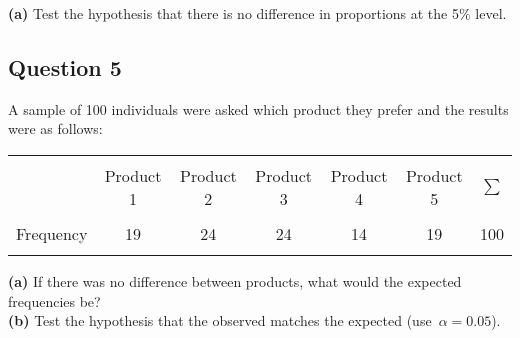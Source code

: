 \documentclass[12pt]{article}
\begin{document}
{\bf(a)} Test the hypothesis that there is no difference in proportions at the 5\% level.



\subsection*{Question 5}
A sample of 100 individuals were asked which product they prefer and the results were as follows:  \\[-0.2cm]
\begin{center}
\begin{tabular}{|c|ccccc|c|}
\hline
&&&&&&\\[-0.3cm]
 & Product 1 & Product 2 & Product 3 & Product 4 & Product 5 & $\sum$ \\[0.1cm]
\hline
&&&&&&\\[-0.3cm]
Frequency & 19 & 24 & 24 & 14 & 19 & 100\\[0.1cm]
\hline
\multicolumn{7}{c}{}\\[-0.3cm]
\end{tabular}
\end{center}

{\bf(a)} If there was no difference between products, what would the expected frequencies be? \quad \\{\bf(b)} Test the hypothesis that the observed matches the expected \mbox{(use $\alpha=0.05$)}.
\end{document}
